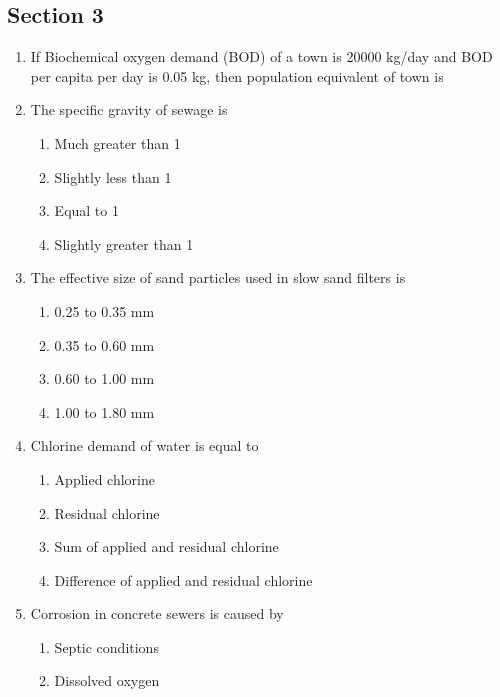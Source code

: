 \documentclass[11pt,a4paper]{article}
\begin{document}
\subsection*{Section 3}
\begin{enumerate}
\item{If Biochemical oxygen demand (BOD) of a town is 20000 kg/day and BOD per capita per day is 0.05 kg, then population equivalent of town is}
\\
\item{The specific gravity of sewage is}
\begin{enumerate}[label=\Alph*.]
\item{Much greater than 1}
\item{Slightly less than 1}
\item{Equal to 1}
\item{Slightly greater than 1}
\end{enumerate}
\item{The effective size of sand particles used in slow sand filters is}
\begin{enumerate}[label=\Alph*.]
\item{0.25 to 0.35 mm}
\item{0.35 to 0.60 mm}
\item{0.60 to 1.00 mm}
\item{1.00 to 1.80 mm}
\end{enumerate}
\item{Chlorine demand of water is equal to}
\begin{enumerate}[label=\Alph*.]
\item{Applied chlorine}
\item{Residual chlorine}
\item{Sum of applied and residual chlorine}
\item{Difference of applied and residual chlorine}
\end{enumerate}
\item{Corrosion in concrete sewers is caused by}
\begin{enumerate}[label=\Alph*.]
\item{Septic conditions}
\item{Dissolved oxygen}

\end{enumerate}
\end{enumerate}
\end{document}

